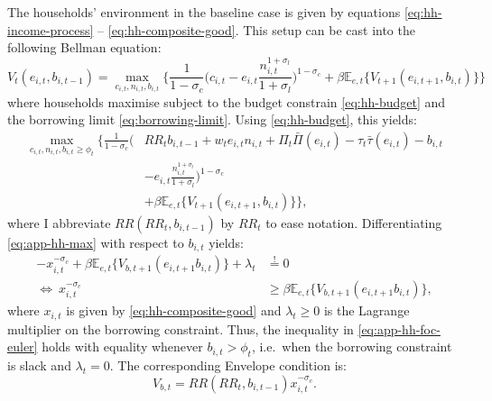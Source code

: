 \documentclass[a4paper,12pt]{article} %
\numberwithin{equation}{section} %
\numberwithin{figure}{section}
\numberwithin{table}{section}
\begin{document}
\begin{refsection}
\begin{appendices}
The households' environment in the baseline case is given by equations \eqref{eq:hh-income-process} -- \eqref{eq:hh-composite-good}. This setup can be cast into the following Bellman equation:
\begin{equation}
    V_t (e_{i,t}, b_{i,t-1}) = \max_{c_{i,t}, n_{i,t}, b_{i,t}} \Bigg\{ \frac{1}{1-\sigma_c} \Bigg( c_{i,t} - e_{i,t}\frac{n_{i,t}^{1+\sigma_l}}{1+\sigma_l} \Bigg)^{1-\sigma_c} + \beta \mathbb{E}_{e,t} \{ V_{t+1} (e_{i,t+1}, b_{i,t}) \} \Bigg\} \label{eq:app-hh-bellman}
\end{equation}
where households maximise subject to the budget constrain \eqref{eq:hh-budget} and the borrowing limit \eqref{eq:borrowing-limit}. Using \eqref{eq:hh-budget}, this yields:
\begin{align}
    \max_{c_{i,t}, n_{i,t}, b_{i,t} \ge \phi_t} \Bigg\{ \frac{1}{1-\sigma_c} \Bigg( &RR_t b_{i,t-1} + w_t e_{i,t} n_{i,t} + \Pi_t \bar{\Pi} (e_{i,t}) - \tau_t \bar{\tau} (e_{i,t}) - b_{i,t} \nonumber \\ 
    &- e_{i,t}\frac{n_{i,t}^{1+\sigma_l}}{1+\sigma_l} \Bigg)^{1-\sigma_c} \nonumber \\ 
    &+ \beta \mathbb{E}_{e,t} \{ V_{t+1} (e_{i,t+1}, b_{i,t}) \} \Bigg\}, \label{eq:app-hh-max}
\end{align}
where I abbreviate $RR (RR_t, b_{i,t-1})$ by $RR_t$ to ease notation. Differentiating \eqref{eq:app-hh-max} with respect to $b_{i,t}$ yields:
\begin{align}
    - x_{i,t}^{-\sigma_c} + \beta \mathbb{E}_{e,t} \{ V_{b,t+1} (e_{i,t+1} b_{i,t} ) \} + \lambda_t &\overset{!}{=} 0 \nonumber \\
    \Leftrightarrow \ x_{i,t}^{-\sigma_c} &\ge \beta \mathbb{E}_{e,t} \{ V_{b,t+1} (e_{i,t+1} b_{i,t} ) \}, \label{eq:app-hh-foc-euler}
\end{align}
where $x_{i,t}$ is given by \eqref{eq:hh-composite-good} and $\lambda_t \ge 0$ is the Lagrange multiplier on the borrowing constraint. Thus, the inequality in \eqref{eq:app-hh-foc-euler} holds with equality whenever $b_{i,t} > \phi_t$, i.e.~when the borrowing constraint is slack and $\lambda_t = 0$. The corresponding Envelope condition is:
\begin{equation}
    V_{b,t} = RR (RR_t, b_{i,t-1}) x_{i,t}^{-\sigma_c}. \label{eq:app-hh-foc-envelope}
\end{equation}


\end{appendices}
\end{refsection}
\end{document}
